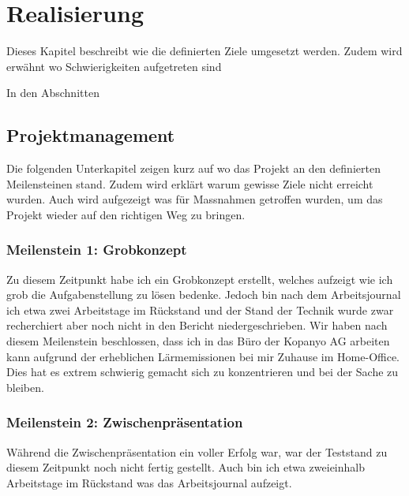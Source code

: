 \chapter{Realisierung}


Dieses Kapitel beschreibt wie die definierten Ziele umgesetzt werden.
Zudem wird erwähnt wo Schwierigkeiten aufgetreten sind 

In den Abschnitten 

\section{Projektmanagement}\label{sec:real_projektmanagement}

Die folgenden Unterkapitel zeigen kurz auf wo das Projekt an den definierten Meilensteinen stand.
Zudem wird erklärt warum gewisse Ziele nicht erreicht wurden. Auch wird aufgezeigt was für Massnahmen getroffen wurden, um das Projekt wieder auf den richtigen Weg zu bringen.

\subsection{Meilenstein 1: Grobkonzept}

Zu diesem Zeitpunkt habe ich ein Grobkonzept erstellt, welches aufzeigt wie ich grob die Aufgabenstellung zu lösen bedenke.
Jedoch bin nach dem Arbeitsjournal ich etwa zwei Arbeitstage im Rückstand und der Stand der Technik wurde zwar recherchiert aber noch nicht in den Bericht niedergeschrieben.
Wir haben nach diesem Meilenstein beschlossen, dass ich in das Büro der Kopanyo AG arbeiten kann aufgrund der erheblichen Lärmemissionen bei mir Zuhause im Home-Office. Dies hat es extrem schwierig gemacht sich zu konzentrieren und bei der Sache zu bleiben.

\subsection{Meilenstein 2: Zwischenpräsentation}

Während die Zwischenpräsentation ein voller Erfolg war, war der Teststand zu diesem Zeitpunkt noch nicht fertig gestellt. Auch bin ich etwa zweieinhalb Arbeitstage im Rückstand was das Arbeitsjournal aufzeigt.

